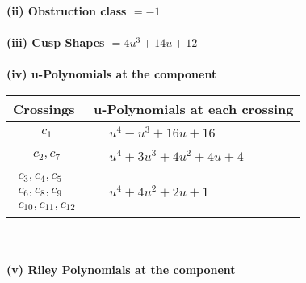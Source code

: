 \documentclass[1p]{elsarticle_modified}
\theoremstyle{definition}
\begin{document}
\flushleft \textbf{(ii) Obstruction class $= -1$}\\~\\
\flushleft \textbf{(iii) Cusp Shapes $= 4 u^3+14 u+12$}\\~\\
\newpage\renewcommand{\arraystretch}{1}
\flushleft \textbf{(iv) u-Polynomials at the component}\newline \\
\begin{tabular}{m{50pt}|m{274pt}}
Crossings & \hspace{64pt}u-Polynomials at each crossing \\
\hline $$\begin{aligned}c_{1}\end{aligned}$$&$\begin{aligned}
&u^4- u^3+16 u+16
\end{aligned}$\\
\hline $$\begin{aligned}c_{2},c_{7}\end{aligned}$$&$\begin{aligned}
&u^4+3 u^3+4 u^2+4 u+4
\end{aligned}$\\
\hline $$\begin{aligned}c_{3},c_{4},c_{5}\\c_{6},c_{8},c_{9}\\c_{10},c_{11},c_{12}\end{aligned}$$&$\begin{aligned}
&u^4+4 u^2+2 u+1
\end{aligned}$\\
\hline
\end{tabular}\\~\\
\newpage\renewcommand{\arraystretch}{1}
\flushleft \textbf{(v) Riley Polynomials at the component}\newline \\
\end{document}
